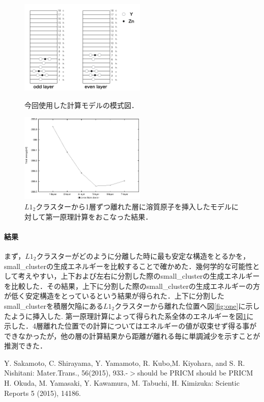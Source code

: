 \documentclass[12pt, a4paper]{jarticle}
\newcommand{\講演番号}
{14pPSA-18}
\newcommand{\講演題目}
{Mg-LPSOのL\mbox{\boldmath $1_2$} クラスターの第一原理計算}
\newcommand{\英文題目}
{First principle calculations of L12 Cluster in Mg-Zn-Y alloy}
\newcommand{\和文所属}
{関西学院大・理工}
\newcommand{\和文氏名}
{西谷滋人, 清原資之, 森下慎也}
\newcommand{\英文所属}
{Department of Informatics, Kwansei Gakuin Univ}
\newcommand{\英文氏名}
{S. R. Nishitani, M. Kiyohara, S. Morishita}
\newlength\題目幅
\newlength\ヘッダ項目間隔
\newlength\所属インデント
\newlength\和文氏名インデント
\newlength\英文氏名インデント
\newlength\最小所属氏名間隔
\newlength\ヘッダ行間隔
\newlength\本文行間隔
\newlength\上端余白
\newlength\左端余白
\begin{document}
\begin{figure}[H]
 \begin{minipage}{0.5\hsize}
  \begin{center}
   \includegraphics[width=60mm]{./small_cluster_slab.png}
  \end{center}
  \caption{今回使用した計算モデルの模式図．}
  \label{fig:one}
 \end{minipage}
 \begin{minipage}{0.5\hsize}
  \begin{center}
   \includegraphics[width=60mm]{./small_cluster.eps}
  \end{center}
  \caption{$L1_2$クラスターから1層ずつ離れた層に溶質原子を挿入したモデルに対して第一原理計算をおこなった結果．}
  \label{fig:two}
 \end{minipage}
\end{figure}

\vspace{-1.3\baselineskip}
\paragraph{結果}
まず，$L1_2$クラスターがどのように分離した時に最も安定な構造をとるかを，small\_clusterの生成エネルギーを比較することで確かめた．幾何学的な可能性として考えやすい，上下および左右に分割した際のsmall\_clusterの生成エネルギーを比較した．その結果，上下に分割した際のsmall\_clusterの生成エネルギーの方が低く安定構造をとっているという結果が得られた．上下に分割したsmall\_clusterを積層欠陥にある$L1_2$クラスターから離れた位置へ図\ref{fig:one}に示したように挿入した. 第一原理計算によって得られた系全体のエネルギーを図\ref{fig:two}に示した．4層離れた位置での計算についてはエネルギーの値が収束せず得る事ができなかったが，他の層の計算結果から距離が離れる毎に単調減少を示すことが推測できた．

{\small\setlength\baselineskip{10pt}	%
\begin{thebibliography}{9}
Y. Sakamoto, C. Shirayama, Y. Yamamoto, R. Kubo,M. Kiyohara, and S. R. Nishitani: Mater.Trans., 56(2015), 933.-$>$should be PRICM
 should be PRICM
H. Okuda, M. Yamasaki, Y. Kawamura, M. Tabuchi, H. Kimizuka: Scientic Reports 5 (2015), 14186.
\end{thebibliography}
}
\end{document}
